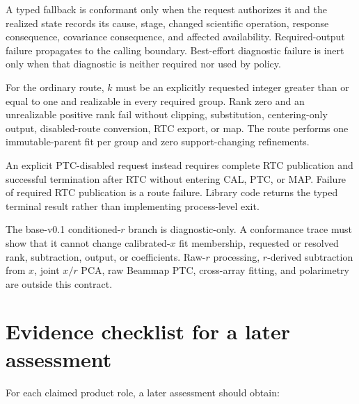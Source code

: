 \documentclass[10pt]{article}
\begin{document}
A typed fallback is conformant only when the request authorizes it and the
realized state records its cause, stage, changed scientific operation,
response consequence, covariance consequence, and affected availability.
Required-output failure propagates to the calling boundary. Best-effort
diagnostic failure is inert only when that diagnostic is neither required nor
used by policy.

For the ordinary route, $k$ must be an explicitly requested integer greater
than or equal to one and realizable in every required group. Rank zero and an
unrealizable positive rank fail without clipping, substitution, centering-only
output, disabled-route conversion, RTC export, or map. The route performs one
immutable-parent fit per group and zero support-changing refinements.

An explicit PTC-disabled request instead requires complete RTC publication
and successful termination after RTC without entering CAL, PTC, or MAP.
Failure of required RTC publication is a route failure. Library code returns
the typed terminal result rather than implementing process-level exit.

The base-v0.1 conditioned-$r$ branch is diagnostic-only. A conformance trace
must show that it cannot change calibrated-$x$ fit membership, requested or
resolved rank, subtraction, output, or coefficients. Raw-$r$ processing,
$r$-derived subtraction from
$x$, joint $x/r$ PCA, raw Beammap PTC, cross-array fitting, and polarimetry are
outside this contract.

\section{Evidence checklist for a later assessment}
\label{sec:engineering-evidence}

For each claimed product role, a later assessment should obtain:
\end{document}
